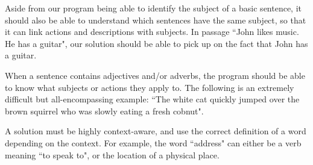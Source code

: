 \begin{objective}
Aside from our program being able to identify the subject of a basic sentence, it should also be able to understand which sentences have the same subject, so that it can link actions and descriptions with subjects. In passage ``John likes music. He has a guitar", our solution should be able to pick up on the fact that John has a guitar.
\end{objective}

\begin{objective}
When a sentence contains adjectives and/or adverbs, the program should be able to know what subjects or actions they apply to. The following is an extremely difficult but all-encompassing example: ``The white cat quickly jumped over the brown squirrel who was slowly eating a fresh cobnut".
\end{objective}

\begin{objective}[Context]
A solution must be highly context-aware, and use the correct definition of a word depending on the context. For example, the word ``address" can either be a verb meaning ``to speak to", or the location of a physical place.
\end{objective}